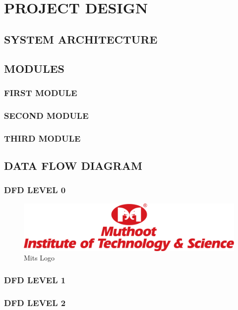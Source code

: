 \chapter{PROJECT DESIGN}
\section{SYSTEM ARCHITECTURE}
\section{MODULES}
\subsection{FIRST MODULE}

\subsection{SECOND MODULE}
\subsection{THIRD MODULE}



\section{DATA FLOW DIAGRAM}
\subsection{DFD LEVEL 0}

\begin{figure}[hbtp]
    \centering
    \includegraphics[width=\textwidth]{images/MITS.png}
    \caption{Mits Logo}
\end{figure}

\subsection{DFD LEVEL 1}

\subsection{DFD LEVEL 2}


